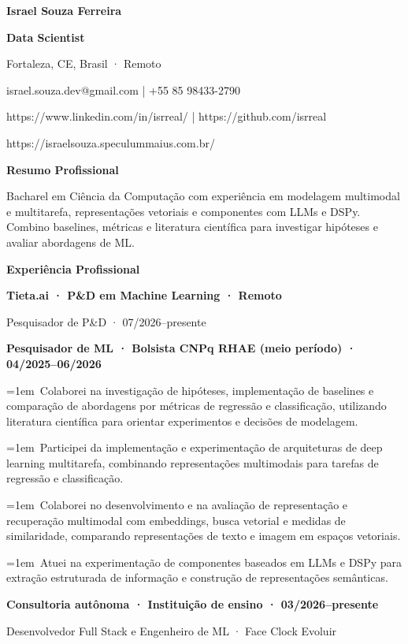 \documentclass[a4paper,10pt]{article}
\begin{document}
\textbf{Israel Souza Ferreira}\par
\textbf{Data Scientist}\par
Fortaleza, CE, Brasil · Remoto\par
israel.souza.dev@gmail.com | +55 85 98433-2790\par
https://www.linkedin.com/in/isrreal/ | https://github.com/isrreal\par
https://israelsouza.speculummaius.com.br/\par
\vspace{5pt}\textbf{Resumo Profissional}\par
Bacharel em Ciência da Computação com experiência em modelagem multimodal e multitarefa, representações vetoriais e componentes com LLMs e DSPy. Combino baselines, métricas e literatura científica para investigar hipóteses e avaliar abordagens de ML.\par
\vspace{5pt}\textbf{Experiência Profissional}\par
\textbf{Tieta.ai · P\&D em Machine Learning · Remoto}\par
Pesquisador de P\&D · 07/2026–presente\par
\textbf{Pesquisador de ML · Bolsista CNPq RHAE (meio período) · 04/2025–06/2026}\par
\hangindent=1em\textbullet\ Colaborei na investigação de hipóteses, implementação de baselines e comparação de abordagens por métricas de regressão e classificação, utilizando literatura científica para orientar experimentos e decisões de modelagem.\par
\hangindent=1em\textbullet\ Participei da implementação e experimentação de arquiteturas de deep learning multitarefa, combinando representações multimodais para tarefas de regressão e classificação.\par
\hangindent=1em\textbullet\ Colaborei no desenvolvimento e na avaliação de representação e recuperação multimodal com embeddings, busca vetorial e medidas de similaridade, comparando representações de texto e imagem em espaços vetoriais.\par
\hangindent=1em\textbullet\ Atuei na experimentação de componentes baseados em LLMs e DSPy para extração estruturada de informação e construção de representações semânticas.\par
\textbf{Consultoria autônoma · Instituição de ensino · 03/2026–presente}\par
Desenvolvedor Full Stack e Engenheiro de ML · Face Clock Evoluir\par
\end{document}
